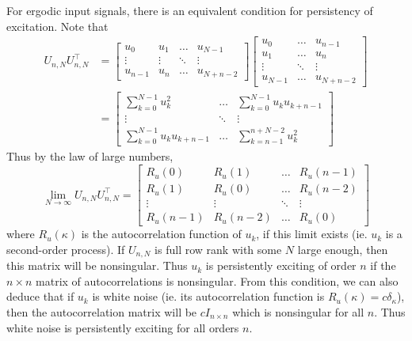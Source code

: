 \documentclass[11pt]{report} %
\begin{document}
For ergodic input signals, there is an equivalent condition for persistency of excitation. Note that
\begin{align}
U_{n, N}U_{n, N}^{\top} &= \begin{bmatrix}u_{0} & u_{1} & \dots & u_{N-1}\\
\vdots & \vdots & \ddots & \vdots\\
u_{n-1} & u_{n} & \dots & u_{N+n-2}
\end{bmatrix}\begin{bmatrix}u_{0} & \dots & u_{n-1}\\
u_{1} & \dots & u_{n}\\
\vdots & \ddots & \vdots\\
u_{N-1} & \dots & u_{N+n-2}
\end{bmatrix} \\
&= \begin{bmatrix}\sum_{k=0}^{N-1}u_{k}^{2} & \dots & \sum_{k=0}^{N-1}u_{k}u_{k+n-1}\\
\vdots & \ddots & \vdots\\
\sum_{k=0}^{N-1}u_{k}u_{k+n-1} & \dots & \sum_{k=n-1}^{n+N-2}u_{k}^{2}
\end{bmatrix}
\end{align}
Thus by the law of large numbers,
\begin{equation}
\lim_{N\to\infty}U_{n, N}U_{n, N}^{\top} = \begin{bmatrix}R_{u}\left(0\right) & R_{u}\left(1\right) & \dots & R_{u}\left(n-1\right)\\
R_{u}\left(1\right) & R_{u}\left(0\right) & \dots & R_{u}\left(n-2\right)\\
\vdots & \vdots & \ddots & \vdots\\
R_{u}\left(n-1\right) & R_{u}\left(n-2\right) & \dots & R_{u}\left(0\right)
\end{bmatrix}
\end{equation}
where $R_{u}\left(\kappa\right)$ is the autocorrelation function of $u_{k}$, if this limit exists (ie. $u_{k}$ is a second-order process). If $U_{n, N}$ is full row rank with some $N$ large enough, then this matrix will be nonsingular. Thus $u_{k}$ is persistently exciting of order $n$ if the $n \times n$ matrix of autocorrelations is nonsingular. From this condition, we can also deduce that if $u_{k}$ is white noise (ie. its autocorrelation function is $R_{u}\left(\kappa\right) = c\delta_{\kappa}$), then the autocorrelation matrix will be $cI_{n\times n}$ which is nonsingular for all $n$. Thus white noise is persistently exciting for all orders $n$. 
\end{document}

